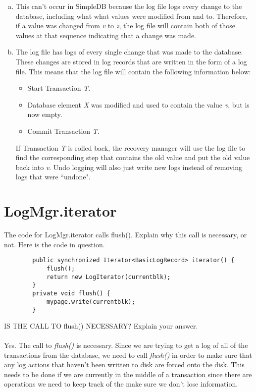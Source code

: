 \documentclass [letter,12pt] {article}
\begin{document}
    \begin{enumerate}[(a)]
        \item This can't occur in SimpleDB because the log file logs every
            change to the database, including what what values were modified
            from and to. Therefore, if a value was changed from \textit{v}
            to \textit{z}, the log file will contain both of those values at
            that sequence indicating that a change was made.
        \item The log file has logs of every single change that was made to 
            the database. These changes are stored in log records that are 
            written in the form of a log file. This means that the log file
            will contain the following information below:
            \begin{itemize}
                \item Start Transaction \textit{T}.
                \item Database element \textit{X} was modified and used 
                    to contain the value \textit{v}, but is now empty.
                \item Commit Transaction \textit{T}.
            \end{itemize}

            If Transaction \textit{T} is rolled back, the recovery manager will
            use the log file to find the corresponding step that contains the 
            old value and put the old value back into \textit{v}. Undo logging 
            will also just write new logs instead of removing logs that were
            “undone".
    \end{enumerate}


\section{LogMgr.iterator}
    The code for LogMgr.iterator calls flush(). Explain why this call is 
    necessary, or not. Here is the code in question.

    \begin{verbatim}
        public synchronized Iterator<BasicLogRecord> iterator() {
            flush();
            return new LogIterator(currentblk);
        }
        private void flush() {
            mypage.write(currentblk);
        }
    \end{verbatim}
    IS THE CALL TO flush() NECESSARY? Explain your answer.
    \\
    \\
    Yes. The call to \textit{flush()} is necessary. Since we are trying
    to get a log of all of the transactions from the database, we need
    to call \textit{flush()} in order to make sure that any log actions
    that haven't been written to disk are forced onto the disk. This 
    needs to be done if we are currently in the middle of a transaction
    since there are operations we need to keep track of the make sure
    we don't lose information.
\end{document}
